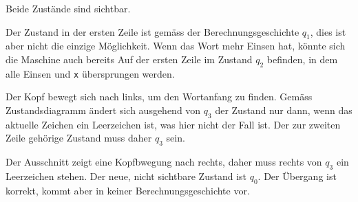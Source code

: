 \begin{loesung}
\begin{teilaufgaben}
\item
Beide Zustände sind sichtbar.
\item
Der Zustand in der ersten Zeile ist gemäss der Berechnungsgeschichte
$q_1$, dies ist aber nicht die einzige Möglichkeit.
Wenn das Wort mehr Einsen hat, könnte sich die Maschine auch bereits
Auf der ersten Zeile im Zustand $q_2$ befinden, in dem alle Einsen
und \texttt{x} übersprungen werden.
\item
Der Kopf bewegt sich nach links, um den Wortanfang zu finden.
Gemäss Zustandsdiagramm ändert sich ausgehend von $q_3$ der Zustand
nur dann, wenn das aktuelle Zeichen ein Leerzeichen ist, was hier
nicht der Fall ist.
Der zur zweiten Zeile gehörige Zustand muss daher $q_3$ sein.
\item
Der Ausschnitt zeigt eine Kopfbwegung nach rechts, daher muss
rechts von $q_3$ ein Leerzeichen stehen.
Der neue, nicht sichtbare Zustand ist $q_0$.
Der Übergang ist korrekt, kommt aber in keiner Berechnungsgeschichte
vor.
\qedhere
\end{teilaufgaben}
\end{loesung}
